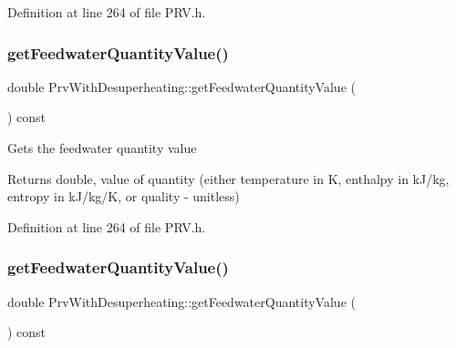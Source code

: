 Definition at line 264 of file P\+R\+V.\+h.

\mbox{\label{class_prv_with_desuperheating_a8645a251b2e77e434a8bc51dfedcad69}} 
\subsubsection{\texorpdfstring{get\+Feedwater\+Quantity\+Value()}{getFeedwaterQuantityValue()}\hspace{0.1cm}{\footnotesize\ttfamily [2/3]}}
{\footnotesize\ttfamily double Prv\+With\+Desuperheating\+::get\+Feedwater\+Quantity\+Value (\begin{DoxyParamCaption}{ }\end{DoxyParamCaption}) const\hspace{0.3cm}{\ttfamily [inline]}}

Gets the feedwater quantity value

\begin{DoxyReturn}{Returns}
double, value of quantity (either temperature in K, enthalpy in k\+J/kg, entropy in k\+J/kg/K, or quality -\/ unitless) 
\end{DoxyReturn}


Definition at line 264 of file P\+R\+V.\+h.

\mbox{\label{class_prv_with_desuperheating_a8645a251b2e77e434a8bc51dfedcad69}} 
\subsubsection{\texorpdfstring{get\+Feedwater\+Quantity\+Value()}{getFeedwaterQuantityValue()}\hspace{0.1cm}{\footnotesize\ttfamily [3/3]}}
{\footnotesize\ttfamily double Prv\+With\+Desuperheating\+::get\+Feedwater\+Quantity\+Value (\begin{DoxyParamCaption}{ }\end{DoxyParamCaption}) const\hspace{0.3cm}{\ttfamily [inline]}}

